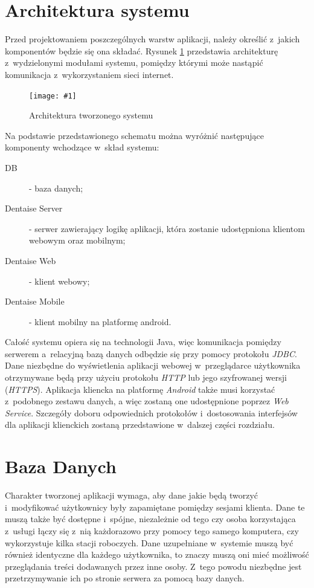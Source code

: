 \documentclass[11pt]{aghdpl}
\newcommand{\fullWidthPicture}[2]{
\begin{figure}[h!]
	\centering
		\texttt{[image: \#1]}
	\caption{#2}
	\label{fig:#1}
\end{figure}
}
\begin{document}
\section{Architektura systemu}

Przed projektowaniem poszczególnych warstw aplikacji, należy określić z~jakich komponentów będzie się ona składać. Rysunek \ref{fig:architektura} przedstawia architekturę z~wydzielonymi modułami systemu, pomiędzy którymi może nastąpić komunikacja z~wykorzystaniem sieci internet.

\fullWidthPicture{architektura}{Architektura tworzonego systemu}

Na podstawie przedstawionego schematu można wyróżnić następujące komponenty wchodzące w~skład systemu:
\begin{description}
\item[DB] - baza danych;
\item[Dentaise Server] - serwer zawierający logikę aplikacji, która zostanie udostępniona klientom webowym oraz mobilnym;
\item[Dentaise Web] - klient webowy;
\item[Dentaise Mobile] - klient mobilny na platformę android.
\end{description}

Całość systemu opiera się na technologii Java, więc komunikacja pomiędzy serwerem a~relacyjną bazą danych odbędzie się przy pomocy protokołu \emph{JDBC}. Dane niezbędne do wyświetlenia aplikacji webowej w~przeglądarce użytkownika otrzymywane będą przy użyciu protokołu \emph{HTTP} lub jego szyfrowanej wersji (\emph{HTTPS}). Aplikacja kliencka na platformę \emph{Android} także musi korzystać z~podobnego zestawu danych, a więc zostaną one udostępnione poprzez \emph{Web Service}. Szczegóły doboru odpowiednich protokołów i~dostosowania interfejsów dla aplikacji klienckich zostaną przedstawione w~dalszej części rozdziału. 

\section{Baza Danych}
\label{sec:bazaDanych}

Charakter tworzonej aplikacji wymaga, aby dane jakie będą tworzyć i~modyfikować użytkownicy były zapamiętane pomiędzy sesjami klienta. Dane te muszą także być dostępne i~spójne, niezależnie od tego czy osoba korzystająca z~usługi łączy się z~nią każdorazowo przy pomocy tego samego komputera, czy wykorzystuje kilka stacji roboczych. Dane uzupełniane w~systemie muszą być również identyczne dla każdego użytkownika, to znaczy muszą oni mieć możliwość przeglądania treści dodawanych przez inne osoby. Z~tego powodu niezbędne jest przetrzymywanie ich po stronie serwera za pomocą bazy danych.
\end{document}
